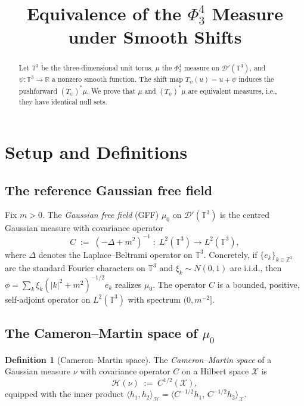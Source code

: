 \documentclass[12pt]{article}
\title{Equivalence of the $\Phi^4_3$ Measure under Smooth Shifts}
\author{}
\date{}
\theoremstyle{definition}
\newtheorem{definition}[theorem]{Definition}
\begin{document}
\maketitle

\begin{abstract}
Let $\mathbb{T}^3$ be the three-dimensional unit torus, $\mu$ the $\Phi^4_3$ measure on
$\mathcal{D}'(\mathbb{T}^3)$, and $\psi\colon\mathbb{T}^3\to\mathbb{R}$ a nonzero smooth function.
The shift map $T_\psi(u)=u+\psi$ induces the pushforward $(T_\psi)^*\mu$.
We prove that $\mu$ and $(T_\psi)^*\mu$ are equivalent measures, i.e., they have identical null
sets.
\end{abstract}

\section{Setup and Definitions}

\subsection{The reference Gaussian free field}

Fix $m>0$.  The \emph{Gaussian free field} (GFF) $\mu_0$ on $\mathcal{D}'(\mathbb{T}^3)$ is the
centred Gaussian measure with covariance operator
\[
  C \;:=\; (-\Delta + m^2)^{-1} \;:\; L^2(\mathbb{T}^3)\to L^2(\mathbb{T}^3),
  \label{eq:covariance}
\]
where $\Delta$ denotes the Laplace--Beltrami operator on $\mathbb{T}^3$.  Concretely, if
$\{e_k\}_{k\in\mathbb{Z}^3}$ are the standard Fourier characters on $\mathbb{T}^3$ and
$\xi_k\sim N(0,1)$ are i.i.d., then $\phi = \sum_k \xi_k (|k|^2+m^2)^{-1/2} e_k$ realizes $\mu_0$.
The operator $C$ is a bounded, positive, self-adjoint operator on $L^2(\mathbb{T}^3)$ with
spectrum $(0, m^{-2}]$.

\subsection{The Cameron--Martin space of $\mu_0$}

\begin{definition}[Cameron--Martin space]
\label{def:CM}
The \emph{Cameron--Martin space} of a Gaussian measure $\nu$ with covariance operator $C$
on a Hilbert space $\mathcal{X}$ is
\[
  \mathcal{H}(\nu) \;:=\; C^{1/2}(\mathcal{X}),
\]
equipped with the inner product
$\langle h_1, h_2\rangle_{\mathcal{H}} = \langle C^{-1/2}h_1,\, C^{-1/2}h_2\rangle_{\mathcal{X}}$.
\end{definition}
\end{document}
